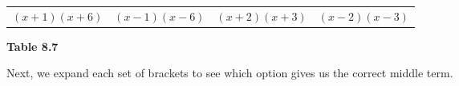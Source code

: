 {\begin{center}
\begin{xtabular*}{\mytablewidth}[t]{|p{10\mystarwidth}|p{10\mystarwidth}|p{10\mystarwidth}|p{10\mystarwidth}|}
                $\left(x+1\right)\left(x+6\right)$
               &
                $\left(x-1\right)\left(x-6\right)$
               &
                $\left(x+2\right)\left(x+3\right)$
               &
                $\left(x-2\right)\left(x-3\right)$
     \tabularnewline{}
    \end{xtabular*}
      \end{center}
    \begin{center}{\small\bfseries Table 8.7}\end{center}
        }%
    \par
      \label{m39394*id276261}Next, we expand each set of brackets to see which option gives us the correct middle term.\par 
